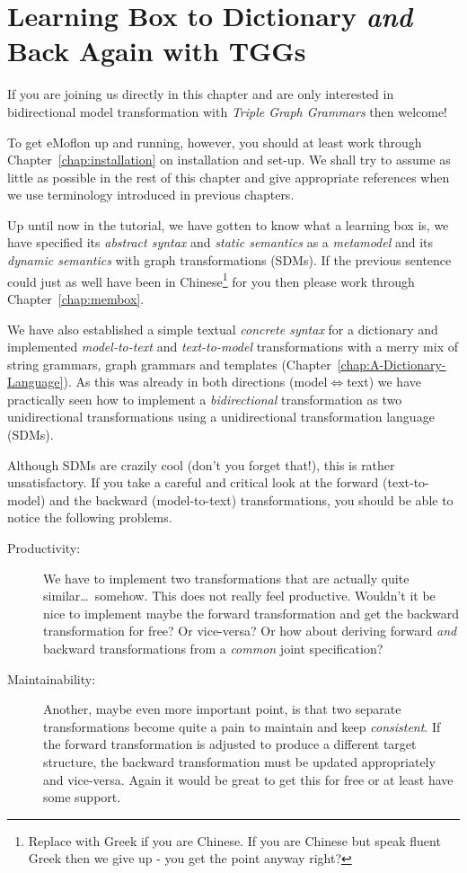\chapter{Learning Box to Dictionary \emph{and} Back Again with TGGs}
\label{Learning-Box-to-Dictionary-and-Back-Again}

If you are joining us directly in this chapter and are only interested in bidirectional model transformation with \emph{Triple Graph Grammars} then welcome!

To get eMoflon up and running, however, you should at least work through Chapter~\ref{chap:installation} on installation and set-up.
We shall try to assume as little as possible in the rest of this chapter and give appropriate references when we use terminology introduced in previous chapters.

Up until now in the tutorial, we have gotten to know what a learning box is, we have specified its \emph{abstract syntax} and \emph{static semantics} as a \emph{metamodel} and its \emph{dynamic semantics} with graph transformations (SDMs).
If the previous sentence could just as well have been in Chinese\footnote{Replace with Greek if you are Chinese.  If you are Chinese but speak fluent Greek then we give up - you get the point anyway right?} for you then please work through Chapter~\ref{chap:membox}.

We have also established a simple textual \emph{concrete syntax} for a dictionary and implemented \emph{model-to-text} and \emph{text-to-model} transformations with a merry mix of string grammars, graph grammars and templates (Chapter~\ref{chap:A-Dictionary-Language}).
As this was already in both directions (model$\Leftrightarrow$text) we have practically seen how to implement a \emph{bidirectional} transformation as two unidirectional transformations using a unidirectional transformation language (SDMs).

Although SDMs are crazily cool (don't you forget that!), this is rather unsatisfactory.  
If you take a careful and critical look at the forward (text-to-model) and the backward (model-to-text) transformations, you should be able to notice the following problems.
\begin{description}
  \item[Productivity:] We have to implement two transformations that are actually quite similar\ldots ~somehow.  This does not really feel productive.  Wouldn't it be nice to implement maybe the forward transformation and get the backward transformation for free?  Or vice-versa?  Or how about deriving forward \emph{and} backward transformations from a \emph{common} joint specification?
  \item[Maintainability:] Another, maybe even more important point, is that two separate transformations become quite a pain to maintain and keep \emph{consistent}.  If the forward transformation is adjusted to produce a different target structure, the backward transformation must be updated appropriately and vice-versa.  Again it would be great to get this for free or at least have some support. 
\end{description}

